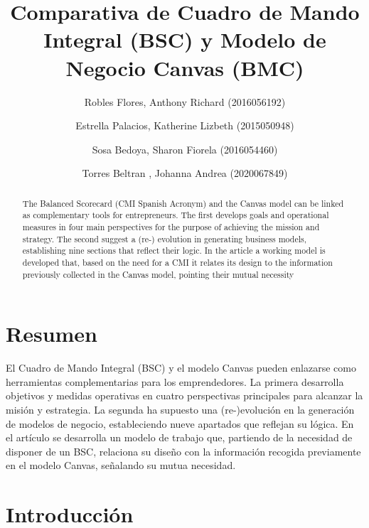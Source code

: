 \documentclass[preprint,12pt]{elsarticle}
\begin{document}
	
	\begin{frontmatter}

		\title{\huge  Comparativa de Cuadro de Mando Integral (BSC) y Modelo de Negocio Canvas (BMC) }
		\author{Robles Flores, Anthony Richard	                (2016056192)}
		\author{Estrella Palacios, Katherine Lizbeth			(2015050948)}
		\author{Sosa Bedoya, Sharon Fiorela				(2016054460)}
		\author{Torres Beltran , Johanna Andrea			(2020067849)}
		\address{Tacna, Perú}
		


\begin{abstract}
The Balanced Scorecard (CMI Spanish Acronym) and the Canvas model can be linked as complementary tools for entrepreneurs. The first develops goals and operational measures in four main perspectives for the purpose of achieving the mission and strategy. The second suggest a (re-) evolution in generating business models, establishing nine sections that reflect their logic. In the article a working model is developed that, based on the need for a CMI it relates its design to the information previously collected in the Canvas model, pointing their mutual necessity
\end{abstract}


\end{frontmatter}

\section{Resumen}
El Cuadro de Mando Integral (BSC) y el modelo Canvas pueden enlazarse como herramientas complementarias para los emprendedores. La primera desarrolla objetivos y medidas operativas en cuatro perspectivas principales para alcanzar la misión y estrategia. La segunda ha supuesto una (re-)evolución en la generación de modelos de negocio, estableciendo nueve apartados que reflejan su lógica. En el artículo se desarrolla un modelo de trabajo que, partiendo de la necesidad de disponer de un BSC, relaciona su diseño con la información recogida previamente en el modelo Canvas, señalando su mutua necesidad.


\section{Introducción}



\end{document}
